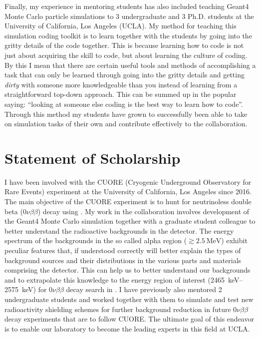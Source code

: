 \documentclass[10pt]{article} %
\begin{document}
Finally, my experience in mentoring students has also included teaching Geant4
Monte Carlo particle simulations to 3 undergraduate and 3 Ph.D. students at the
University of California, Los Angeles (UCLA). My method for teaching this
simulation coding toolkit is to learn together with the students by going into
the gritty details of the code together. This is because learning how to code
is not just about acquiring the skill to code, but about learning the culture
of coding. By this I mean that there are certain useful tools and methods of
accomplishing a task that can only be learned through going into the gritty
details and getting \textit{dirty} with someone more knowledgeable than you
instead of learning from a straightforward top-down approach. This can be
summed up in the popular saying: ``looking at someone else coding is the best
way to learn how to code''. Through this method my students have grown to
successfully been able to take on simulation tasks of their own and contribute
effectively to the collaboration.


\clearpage
\section{Statement of Scholarship}

I have been involved with the CUORE (Cryogenic Underground Observatory for Rare
Events) experiment at the University of California, Los Angeles since 2016. The
main objective of the CUORE experiment is to hunt for neutrinoless double beta
($0\nu\beta\beta$) decay using . My work in the collaboration
involves development of the Geant4 Monte Carlo simulation together with a
graduate student colleague to better understand the radioactive backgrounds in
the detector. The energy spectrum of the backgrounds in the so called alpha
region ($\gtrsim \SI{2.5}{\mega\electronvolt}$) exhibit peculiar features that,
if understood correctly will better explain the types of background sources and
their distributions in the various parts and materials comprising the detector.
This can help us to better understand our backgrounds and to extrapolate this
knowledge to the energy region of interest
(\SIrange{2465}{2575}{\kilo\electronvolt}) for $0\nu\beta\beta$ decay search in
. I have previously also mentored 2 undergraduate students and
worked together with them to simulate and test new radioactivity shielding
schemes for further background reduction in future $0\nu\beta\beta$ decay
experiments that are to follow CUORE. The ultimate goal of this endeavor is to
enable our laboratory to become the leading experts in this field at UCLA.
\end{document}
